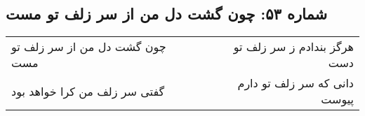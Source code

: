 \begin{center}
\section*{شماره ۵۳: چون گشت دل من از سر زلف تو مست}
\label{sec:053}
\begin{longtable}{l p{0.5cm} r}
چون گشت دل من از سر زلف تو مست
&&
هرگز بندادم ز سر زلف تو دست
\\
گفتی سر زلف من کرا خواهد بود
&&
دانی که سر زلف تو دارم پیوست
\\
\end{longtable}
\end{center}
